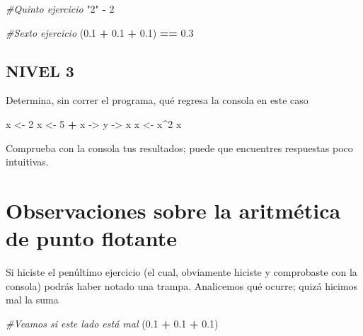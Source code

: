 \documentclass[
]{book}
\newenvironment{Shaded}{\begin{snugshade}}{\end{snugshade}}
\newcommand{\CommentTok}[1]{\textcolor[rgb]{0.56,0.35,0.01}{\textit{#1}}}
\newcommand{\DecValTok}[1]{\textcolor[rgb]{0.00,0.00,0.81}{#1}}
\newcommand{\FloatTok}[1]{\textcolor[rgb]{0.00,0.00,0.81}{#1}}
\newcommand{\NormalTok}[1]{#1}
\newcommand{\OperatorTok}[1]{\textcolor[rgb]{0.81,0.36,0.00}{\textbf{#1}}}
\newcommand{\StringTok}[1]{\textcolor[rgb]{0.31,0.60,0.02}{#1}}
\begin{document}
\begin{Shaded}
\begin{Highlighting}[]
\CommentTok{#Quinto ejercicio}
\StringTok{"2"} \OperatorTok{-}\StringTok{ }\DecValTok{2}
\end{Highlighting}
\end{Shaded}

\begin{Shaded}
\begin{Highlighting}[]
\CommentTok{#Sexto ejercicio}
\NormalTok{(}\FloatTok{0.1} \OperatorTok{+}\StringTok{ }\FloatTok{0.1} \OperatorTok{+}\StringTok{ }\FloatTok{0.1}\NormalTok{) }\OperatorTok{==}\StringTok{ }\FloatTok{0.3}
\end{Highlighting}
\end{Shaded}

\hypertarget{nivel-3}{%
\subsection{NIVEL 3}\label{nivel-3}}

Determina, sin correr el programa, qué regresa la consola en este caso

\begin{Shaded}
\begin{Highlighting}[]
\NormalTok{x <-}\StringTok{ }\DecValTok{2} 
\NormalTok{x <-}\StringTok{ }\DecValTok{5} \OperatorTok{+}\StringTok{ }\NormalTok{x ->}\StringTok{ }\NormalTok{y ->}\StringTok{ }\NormalTok{x}
\NormalTok{x <-}\StringTok{ }\NormalTok{x}\OperatorTok{^}\DecValTok{2}
\NormalTok{x}
\end{Highlighting}
\end{Shaded}

Comprueba con la consola tus resultados; puede que encuentres respuestas poco intuitivas.

\hypertarget{observaciones-sobre-la-aritmuxe9tica-de-punto-flotante}{%
\section{Observaciones sobre la aritmética de punto flotante}\label{observaciones-sobre-la-aritmuxe9tica-de-punto-flotante}}

Si hiciste el penúltimo ejercicio (el cual, obviamente hiciste y comprobaste con la consola) podrás haber notado una trampa. Analicemos qué ocurre; quizá hicimos mal la suma

\begin{Shaded}
\begin{Highlighting}[]
\CommentTok{#Veamos si este lado está mal}
\NormalTok{(}\FloatTok{0.1} \OperatorTok{+}\StringTok{ }\FloatTok{0.1} \OperatorTok{+}\StringTok{ }\FloatTok{0.1}\NormalTok{)}
\end{Highlighting}
\end{Shaded}
\end{document}
